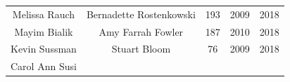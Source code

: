 \documentclass[]{book}
\theoremstyle{definition}
\theoremstyle{definition}
\theoremstyle{definition}
\theoremstyle{remark}
\begin{document}
\begin{longtable}[]{@{}ccccc@{}}
\begin{minipage}[t]{0.22\columnwidth}
Melissa Rauch\strut
\end{minipage} & \begin{minipage}[t]{0.28\columnwidth}\centering\strut
Bernadette Rostenkowski\strut
\end{minipage} & \begin{minipage}[t]{0.12\columnwidth}\centering\strut
193\strut
\end{minipage} & \begin{minipage}[t]{0.14\columnwidth}\centering\strut
2009\strut
\end{minipage} & \begin{minipage}[t]{0.11\columnwidth}\centering\strut
2018\strut
\end{minipage}\tabularnewline
\begin{minipage}[t]{0.22\columnwidth}\centering\strut
Mayim Bialik\strut
\end{minipage} & \begin{minipage}[t]{0.28\columnwidth}\centering\strut
Amy Farrah Fowler\strut
\end{minipage} & \begin{minipage}[t]{0.12\columnwidth}\centering\strut
187\strut
\end{minipage} & \begin{minipage}[t]{0.14\columnwidth}\centering\strut
2010\strut
\end{minipage} & \begin{minipage}[t]{0.11\columnwidth}\centering\strut
2018\strut
\end{minipage}\tabularnewline
\begin{minipage}[t]{0.22\columnwidth}\centering\strut
Kevin Sussman\strut
\end{minipage} & \begin{minipage}[t]{0.28\columnwidth}\centering\strut
Stuart Bloom\strut
\end{minipage} & \begin{minipage}[t]{0.12\columnwidth}\centering\strut
76\strut
\end{minipage} & \begin{minipage}[t]{0.14\columnwidth}\centering\strut
2009\strut
\end{minipage} & \begin{minipage}[t]{0.11\columnwidth}\centering\strut
2018\strut
\end{minipage}\tabularnewline
\begin{minipage}[t]{0.22\columnwidth}\centering\strut
Carol Ann Susi\strut
\end{minipage} & \begin{minipage}[t]{0.28\columnwidth}\centering\strut

\end{minipage}
\end{longtable}
\end{document}
